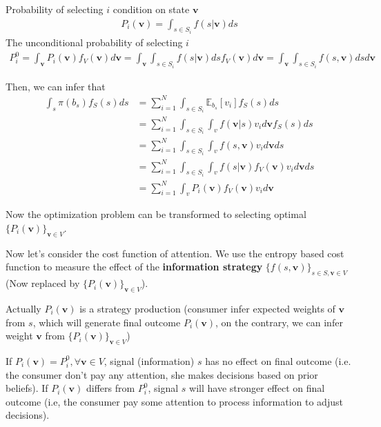 \documentclass[11pt,a4paper]{article}
\begin{document}
Probability of selecting $i$ condition on state $\mathbf{v}$
\begin{equation}
    \begin{aligned}
        P_i(\mathbf{v})=\int_{s\in S_i}f(s|\mathbf{v})ds
    \end{aligned}
    \nonumber
\end{equation}
The unconditional probability of selecting $i$
\begin{equation}
    \begin{aligned}
        P_i^0=\int_{\mathbf{v}}P_i(\mathbf{v})f_V(\mathbf{v})d\mathbf{v}=\int_{\mathbf{v}}\int_{s\in S_i}f(s|\mathbf{v})dsf_V(\mathbf{v})d\mathbf{v}=\int_{\mathbf{v}}\int_{s\in S_i}f(s,\mathbf{v})dsd\mathbf{v}
    \end{aligned}
    \nonumber
\end{equation}

Then, we can infer that
\begin{equation}
    \begin{aligned}
        \int_s \pi(b_s)f_S(s)ds
        &=\sum_{i=1}^N\int_{s\in S_i}\mathbb{E}_{b_s}[v_i] f_S(s)ds\\
        &=\sum_{i=1}^N\int_{s\in S_i}\int_v f(\mathbf{v}|s) v_i d\mathbf{v} f_S(s)ds\\
        &=\sum_{i=1}^N\int_{s\in S_i}\int_v f(s,\mathbf{v}) v_i d\mathbf{v} ds\\
        &=\sum_{i=1}^N\int_{s\in S_i}\int_v f(s|\mathbf{v})f_V(\mathbf{v}) v_i d\mathbf{v} ds\\
        &=\sum_{i=1}^N\int_v P_i(\mathbf{v})f_V(\mathbf{v}) v_i d\mathbf{v}
    \end{aligned}
    \nonumber
\end{equation}

Now the optimization problem can be transformed to selecting optimal $\{P_i(\mathbf{v})\}_{\mathbf{v}\in V}$.

Now let's consider the cost function of attention. We use the entropy based cost function to measure the effect of the \textbf{information strategy} $\{f(s,\mathbf{v})\}_{s\in S,\mathbf{v}\in V}$ (Now replaced by $\{P_i(\mathbf{v})\}_{\mathbf{v}\in V}$).

Actually $P_i(\mathbf{v})$ is a strategy production (consumer infer expected weights of $\mathbf{v}$ from $s$, which will generate final outcome $P_i(\mathbf{v})$, on the contrary, we can infer weight $\mathbf{v}$ from $\{P_i(\mathbf{v})\}_{\mathbf{v}\in V}$)

If $P_i(\mathbf{v})=P_i^0,\forall \mathbf{v}\in V$, signal (information) $s$ has no effect on final outcome (i.e. the consumer don't pay any attention, she makes decisions based on prior beliefs). If $P_i(\mathbf{v})$ differs from $P_i^0$, signal $s$ will have stronger effect on final outcome (i.e, the consumer pay some attention to process information to adjust decisions).
\end{document}

